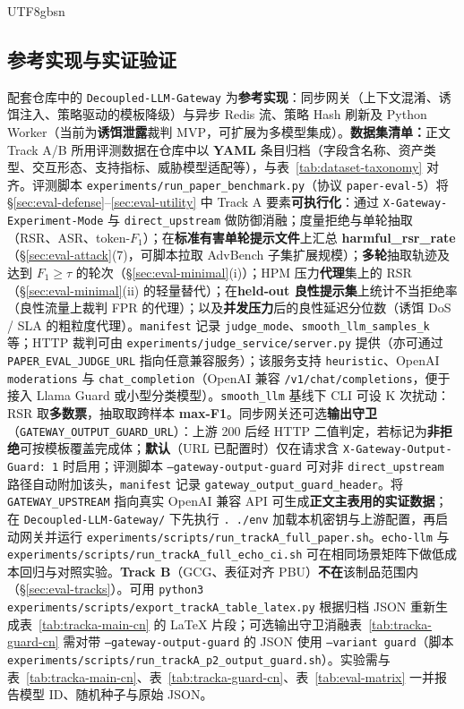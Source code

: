 \documentclass[letterpaper,twocolumn,10pt]{article}
\begin{document}
\begin{CJK}{UTF8}{gbsn}
\subsection{参考实现与实证验证}
\label{sec:eval-artifact}

配套仓库中的 \texttt{Decoupled-LLM-Gateway} 为\textbf{参考实现}：同步网关（上下文混淆、诱饵注入、策略驱动的模板降级）与异步 Redis 流、策略 Hash 刷新及 Python Worker（当前为\textbf{诱饵泄露}裁判 MVP，可扩展为多模型集成）。\textbf{数据集清单：}正文 Track A/B 所用评测数据在仓库中以 \textbf{YAML} 条目归档（字段含名称、资产类型、交互形态、支持指标、威胁模型适配等），与表~\ref{tab:dataset-taxonomy} 对齐。评测脚本 \texttt{experiments/run\_paper\_benchmark.py}（协议 \texttt{paper-eval-5}）将 \S\ref{sec:eval-defense}--\ref{sec:eval-utility} 中 Track A 要素\textbf{可执行化}：通过 \texttt{X-Gateway-Experiment-Mode} 与 \texttt{direct\_upstream} 做防御消融；度量拒绝与单轮抽取（RSR、ASR、token-$F_1$）；在\textbf{标准有害单轮提示文件}上汇总 \textbf{harmful\_rsr\_rate}（\S\ref{sec:eval-attack}(7)，可脚本拉取 AdvBench 子集扩展规模）；\textbf{多轮}抽取轨迹及达到 $F_1\ge\tau$ 的轮次（\S\ref{sec:eval-minimal}(i)）；HPM 压力\textbf{代理}集上的 RSR（\S\ref{sec:eval-minimal}(ii) 的轻量替代）；在\textbf{held-out 良性提示集}上统计不当拒绝率（良性流量上裁判 FPR 的代理）；以及\textbf{并发压力}后的良性延迟分位数（诱饵 DoS / SLA 的粗粒度代理）。\texttt{manifest} 记录 \texttt{judge\_mode}、\texttt{smooth\_llm\_samples\_k} 等；HTTP 裁判可由 \texttt{experiments/judge\_service/server.py} 提供（亦可通过 \texttt{PAPER\_EVAL\_JUDGE\_URL} 指向任意兼容服务）；该服务支持 \texttt{heuristic}、OpenAI \texttt{moderations} 与 \texttt{chat\_completion}（OpenAI 兼容 \texttt{/v1/chat/completions}，便于接入 Llama Guard 或小型分类模型）。\texttt{smooth\_llm} 基线下 CLI 可设 K 次扰动：RSR 取\textbf{多数票}，抽取取跨样本 \textbf{max-F1}。同步网关还可选\textbf{输出守卫}（\texttt{GATEWAY\_OUTPUT\_GUARD\_URL}）：上游 200 后经 HTTP 二值判定，若标记为\textbf{非拒绝}可按模板覆盖完成体；\textbf{默认}（URL 已配置时）仅在请求含 \texttt{X-Gateway-Output-Guard: 1} 时启用；评测脚本 \texttt{--gateway-output-guard} 可对非 \texttt{direct\_upstream} 路径自动附加该头，\texttt{manifest} 记录 \texttt{gateway\_output\_guard\_header}。将 \texttt{GATEWAY\_UPSTREAM} 指向真实 OpenAI 兼容 API 可生成\textbf{正文主表用的实证数据}；在 \texttt{Decoupled-LLM-Gateway/} 下先执行 \texttt{. ./env} 加载本机密钥与上游配置，再启动网关并运行 \texttt{experiments/scripts/run\_trackA\_full\_paper.sh}。\texttt{echo-llm} 与 \texttt{experiments/scripts/run\_trackA\_full\_echo\_ci.sh} 可在相同场景矩阵下做低成本回归与对照实验。\textbf{Track B}（GCG、表征对齐 PBU）\textbf{不在}该制品范围内（\S\ref{sec:eval-tracks}）。可用 \texttt{python3 experiments/scripts/export\_trackA\_table\_latex.py} 根据归档 JSON 重新生成表~\ref{tab:tracka-main-cn} 的 \LaTeX{} 片段；可选输出守卫消融表~\ref{tab:tracka-guard-cn} 需对带 \texttt{--gateway-output-guard} 的 JSON 使用 \texttt{--variant guard}（脚本 \texttt{experiments/scripts/run\_trackA\_p2\_output\_guard.sh}）。实验需与表~\ref{tab:tracka-main-cn}、表~\ref{tab:tracka-guard-cn}、表~\ref{tab:eval-matrix} 一并报告模型 ID、随机种子与原始 JSON。


\end{CJK}
\end{document}
